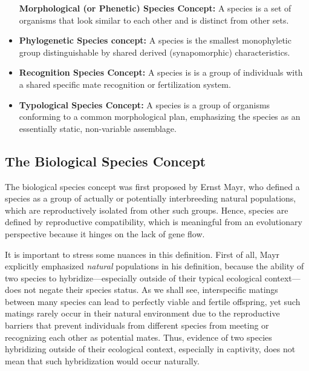 \documentclass[
]{book}
\begin{document}
\begin{itemize}
  \textbf{Morphological (or Phenetic) Species Concept:} A species is a set of organisms that look similar to each other and is distinct from other sets.
\item
  \textbf{Phylogenetic Species concept:} A species is the smallest monophyletic group distinguishable by shared derived (synapomorphic) characteristics.
\item
  \textbf{Recognition Species Concept:} A species is is a group of individuals with a shared specific mate recognition or fertilization system.
\item
  \textbf{Typological Species Concept:} A species is a group of organisms conforming to a common morphological plan, emphasizing the species as an essentially static, non-variable assemblage.
\end{itemize}

\hypertarget{the-biological-species-concept}{%
\subsection{The Biological Species Concept}\label{the-biological-species-concept}}

The biological species concept was first proposed by Ernst Mayr, who defined a species as a group of actually or potentially interbreeding natural populations, which are reproductively isolated from other such groups. Hence, species are defined by reproductive compatibility, which is meaningful from an evolutionary perspective because it hinges on the lack of gene flow.

It is important to stress some nuances in this definition. First of all, Mayr explicitly emphasized \emph{natural} populations in his definition, because the ability of two species to hybridize---especially outside of their typical ecological context---does not negate their species status. As we shall see, interspecific matings between many species can lead to perfectly viable and fertile offspring, yet such matings rarely occur in their natural environment due to the reproductive barriers that prevent individuals from different species from meeting or recognizing each other as potential mates. Thus, evidence of two species hybridizing outside of their ecological context, especially in captivity, does not mean that such hybridization would occur naturally.
\end{document}

